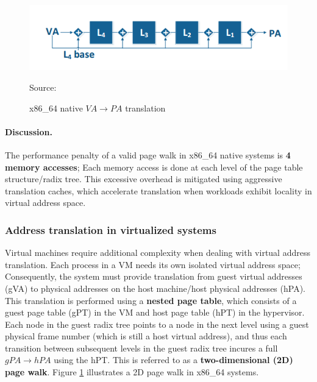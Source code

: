 \documentclass[sigconf]{sigplanconf}
\begin{document}
     \begin{figure}[!h]
     	\centering 
     	\includegraphics[scale=0.35]{1dtrans.png}
     	\caption{x86\_64 native $VA \rightarrow PA$ translation}{Source: \cite{dvmt}}
     	\label{fig:1d}
     \end{figure}
     
     \paragraph{Discussion.} The performance penalty of a valid page walk in x86\_64 native systems is \textbf{4 memory accesses}; Each memory access is done at each level of the page table structure/radix tree. This excessive overhead is mitigated using aggressive translation caches, which accelerate translation when workloads exhibit locality in virtual address space. 
     
     \subsubsection{Address translation in virtualized systems}
     Virtual machines require additional complexity when dealing with virtual address translation. Each process in a VM needs its own isolated virtual address space; Consequently, the system must provide translation from guest virtual addresses (gVA) to physical addresses on the host machine/host physical addresses (hPA). This translation is performed using a \textbf{nested page table}, which consists of a guest page table (gPT) in the VM and host page table (hPT) in the hypervisor. Each node in the guest radix tree points to a node in the next level using a guest physical frame number (which is still a host virtual address), and thus each transition between subsequent levels in the guest radix tree incures a full $gPA \rightarrow hPA$ using the hPT. This is referred to as a \textbf{two-dimensional (2D) page walk}. Figure \ref{fig:1d} illustrates a 2D page walk in x86\_64 systems.
     
\end{document}
